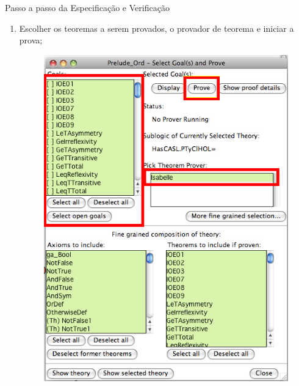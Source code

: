 \documentclass{beamer}
\begin{document}
\begin{frame}[allowframebreaks]{Passo a passo da Especificação e Verificação}
\begin{enumerate}
		\item Escolher os teoremas a serem provados, o provador de teorema e iniciar a prova;
		\begin{figure}
			\includegraphics[height=0.7\textheight]{figuras/passo_a_passo/Picture05.png}
		\end{figure}
		

\end{enumerate}
\end{frame}
\end{document}

